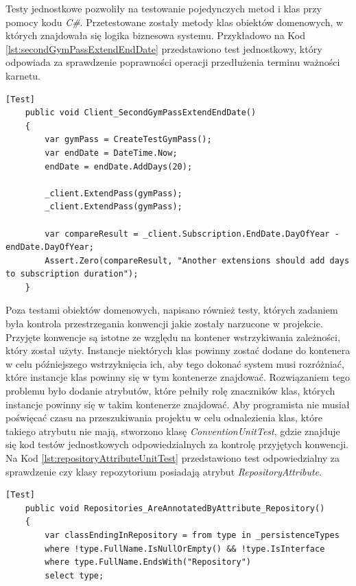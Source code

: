 \documentclass[a4paper,twoside,12pt]{book}
\begin{document}
{Testy jednostkowe pozwoliły na testowanie pojedynczych metod i klas przy pomocy kodu \textit{C\#}. Przetestowane zostały metody klas obiektów domenowych, w których znajdowała się logika biznesowa systemu. Przykładowo na Kod \ref{lst:secondGymPassExtendEndDate} przedstawiono test jednostkowy, który odpowiada za sprawdzenie poprawności operacji przedłużenia terminu ważności karnetu.
\begin{lstlisting}[caption={Przykładowy test klasy \textit{ClientUnitTest}}, label={lst:secondGymPassExtendEndDate}]
	[Test]
	public void Client_SecondGymPassExtendEndDate()
	{
		var gymPass = CreateTestGymPass();
		var endDate = DateTime.Now;
		endDate = endDate.AddDays(20);
		
		_client.ExtendPass(gymPass);
		_client.ExtendPass(gymPass);
		
		var compareResult = _client.Subscription.EndDate.DayOfYear - endDate.DayOfYear;
		Assert.Zero(compareResult, "Another extensions should add days to subscription duration");
	}
\end{lstlisting}

Poza testami obiektów domenowych, napisano również testy, których zadaniem była kontrola przestrzegania konwencji jakie zostały narzucone w projekcie. Przyjęte konwencje są istotne ze względu na kontener wstrzykiwania zależności, który został użyty. Instancje niektórych klas powinny zostać dodane do kontenera w celu późniejszego wstrzyknięcia ich, aby tego dokonać system musi rozróżniać, które instancje klas powinny się w tym kontenerze znajdować. Rozwiązaniem tego problemu było dodanie atrybutów, które pełniły rolę znaczników klas, których instancje powinny się w takim kontenerze znajdować. Aby programista nie musiał poświęcać czasu na przeszukiwania projektu w celu odnalezienia klas, które takiego atrybutu nie mają, stworzono klasę \textit{ConventionUnitTest}, gdzie znajduje się kod testów jednostkowych odpowiedzialnych za kontrolę przyjętych konwencji. Na Kod \ref{lst:repositoryAttributeUnitTest} przedstawiono test odpowiedzialny za sprawdzenie czy klasy repozytorium posiadają atrybut \textit{RepositoryAttribute}.
\begin{lstlisting}[caption={Przykładowy test klasy \textit{ConventionUnitTest}}, label={lst:repositoryAttributeUnitTest}]
	[Test]
	public void Repositories_AreAnnotatedByAttribute_Repository()
	{
		var classEndingInRepository = from type in _persistenceTypes
		where !type.FullName.IsNullOrEmpty() && !type.IsInterface
		where type.FullName.EndsWith("Repository")
		select type;
		

\end{lstlisting}}
\end{document}
